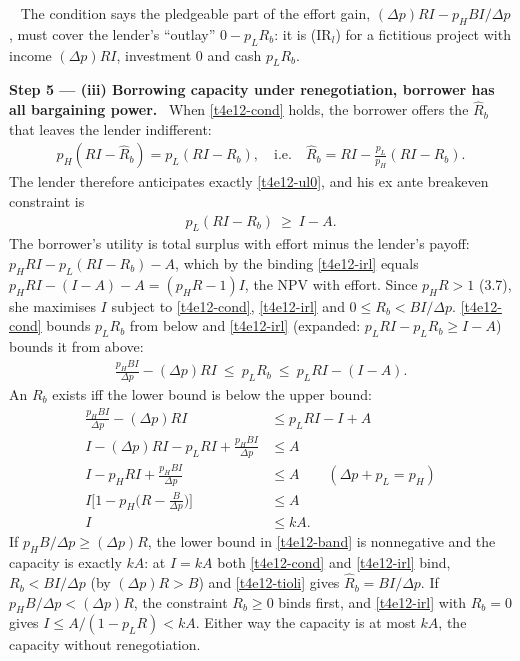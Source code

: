\documentclass[11pt,a4paper]{article}
\newcommand{\step}[2]{\par\medskip\noindent\textbf{Step #1 --- #2.}~}
\newcommand{\answer}[1]{\par\smallskip\noindent\fbox{\textbf{Answer #1.}}~}
\begin{document}
\answer{(ii)} The condition says the pledgeable part of the effort gain, $(\Delta p)RI-p_HBI/\Delta p$,
must cover the lender's ``outlay'' $0-p_LR_b$: it is (IR$_l$) for a fictitious project with income
$(\Delta p)RI$, investment $0$ and cash $p_LR_b$.

\step{5}{(iii) Borrowing capacity under renegotiation, borrower has all bargaining power} When
\eqref{t4e12-cond} holds, the borrower offers the $\hat R_b$ that leaves the lender indifferent:
\begin{align}
  p_H(RI-\hat R_b) = p_L(RI-R_b), \quad\text{i.e.}\quad \hat R_b=RI-\frac{p_L}{p_H}(RI-R_b). \label{t4e12-tioli}
\end{align}
The lender therefore anticipates exactly \eqref{t4e12-ul0}, and his ex ante breakeven constraint is
\begin{align}
  p_L(RI-R_b) \ \ge\ I-A. \label{t4e12-irl}
\end{align}
The borrower's utility is total surplus with effort minus the lender's payoff:
$p_HRI-p_L(RI-R_b)-A$, which by the binding \eqref{t4e12-irl} equals $p_HRI-(I-A)-A=(p_HR-1)I$, the
NPV with effort. Since $p_HR>1$ (3.7), she maximises $I$ subject to
\eqref{t4e12-cond}, \eqref{t4e12-irl} and $0\le R_b<BI/\Delta p$. \eqref{t4e12-cond} bounds $p_LR_b$
from below and \eqref{t4e12-irl} (expanded: $p_LRI-p_LR_b\ge I-A$) bounds it from above:
\begin{align}
  \frac{p_HBI}{\Delta p}-(\Delta p)RI\ \le\ p_LR_b\ \le\ p_LRI-(I-A). \label{t4e12-band}
\end{align}
An $R_b$ exists iff the lower bound is below the upper bound:
\begin{align}
  \frac{p_HBI}{\Delta p}-(\Delta p)RI &\le p_LRI-I+A \nonumber\\
  I-(\Delta p)RI-p_LRI+\frac{p_HBI}{\Delta p} &\le A \nonumber\\
  I-p_HRI+\frac{p_HBI}{\Delta p} &\le A \qquad (\Delta p+p_L=p_H) \nonumber\\
  I\Big[1-p_H\Big(R-\frac{B}{\Delta p}\Big)\Big] &\le A \nonumber\\
  I &\le kA. \label{t4e12-kA}
\end{align}
If $p_HB/\Delta p\ge(\Delta p)R$, the lower bound in \eqref{t4e12-band} is nonnegative and the capacity
is exactly $kA$: at $I=kA$ both \eqref{t4e12-cond} and \eqref{t4e12-irl} bind, $R_b<BI/\Delta p$ (by
$(\Delta p)R>B$) and \eqref{t4e12-tioli} gives $\hat R_b=BI/\Delta p$. If $p_HB/\Delta p<(\Delta p)R$, the
constraint $R_b\ge0$ binds first, and \eqref{t4e12-irl} with $R_b=0$ gives $I\le A/(1-p_LR)<kA$.
Either way the capacity is at most $kA$, the capacity without renegotiation.
\end{document}

